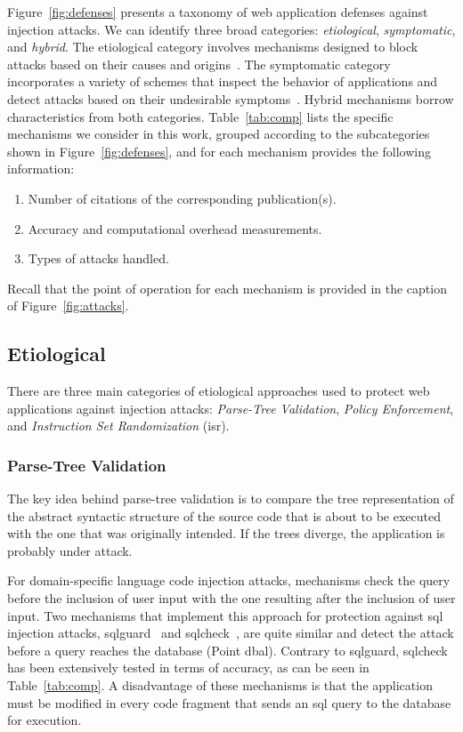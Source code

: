 \documentclass[10pt,journal,compsoc]{IEEEtran}
\begin{document}
Figure~\ref{fig:defenses} presents a taxonomy of 
web application defenses against injection attacks.
We can identify three broad categories:
{\it etiological}, {\it symptomatic}, and {\it hybrid}.
The etiological category involves mechanisms designed to
block attacks based on their causes and origins~\cite{JL75,L81}. 
The symptomatic category incorporates a variety of schemes that
inspect the behavior of applications and detect attacks based on
their undesirable symptoms~\cite{D76,A00}.
Hybrid mechanisms borrow characteristics from both
categories. Table~\ref{tab:comp} lists the specific mechanisms we consider
in this work, grouped according to the subcategories shown in
Figure~\ref{fig:defenses}, and for each mechanism
provides the following information:

\begin{enumerate}
\item Number of citations of the corresponding publication(s).
\item Accuracy and computational overhead measurements.
\item Types of attacks handled.
\end{enumerate}

\noindent
Recall that the point of operation for each mechanism is provided
in the caption of Figure~\ref{fig:attacks}.

\subsection{Etiological}
\label{sec:prot}

There are three main categories of etiological approaches used to protect web
applications against injection attacks:
\emph{Parse-Tree Validation},
\emph{Policy Enforcement}, and
\emph{Instruction Set Randomization} ({\sc isr}).

\subsubsection{Parse-Tree Validation}
\label{sec:tree}

The key idea behind parse-tree validation is to compare the tree
representation of the abstract syntactic structure of the source code
that is about to be executed with the one that was originally
intended. If the trees diverge, the application is probably under
attack.

For domain-specific language code injection attacks, mechanisms check 
the query before the inclusion of user input with the one
resulting after the inclusion of user input.
Two mechanisms that implement this approach for protection
against {\sc sql} injection attacks,
{\sc sqlg}uard~\cite{BWS05} and
{\sc sql}check~\cite{SW06}, are quite similar
and detect the attack before a query reaches the
database (Point {\sc dbal}).
Contrary to {\sc sqlg}uard,
{\sc sql}check has been
extensively tested in terms of accuracy,
as can be seen in Table~\ref{tab:comp}.
A disadvantage of these mechanisms is that the
application must be modified in every code fragment
that sends an {\sc sql} query to the database for execution.
\end{document}
